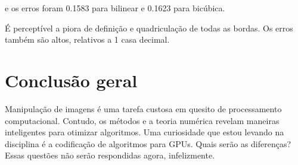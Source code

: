 \documentclass{article}
\begin{document}
e os erros foram 0.1583 para bilinear e 0.1623 para bicúbica.

É perceptível a piora de definição e quadriculação de todas as bordas.
Os erros também são altos, relativos a 1 casa decimal.

\section{Conclusão geral}

Manipulação de imagens é uma tarefa custosa em quesito de processamento
computacional. Contudo, os métodos e a teoria numérica revelam maneiras
inteligentes para otimizar algoritmos. Uma curiosidade que estou levando
na disciplina é a codificação de algoritmos para GPUs. Quais serão as 
diferenças? Essas questões não serão respondidas agora, infelizmente.
\end{document}
